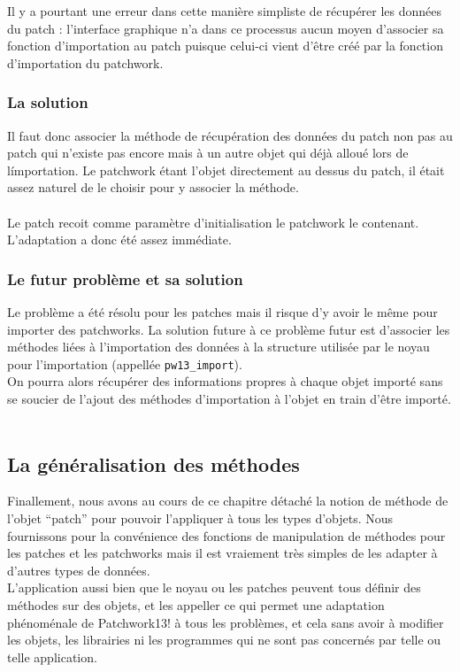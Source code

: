 Il y a pourtant une erreur dans cette mani\`ere simpliste
de r\'ecup\'erer les donn\'ees du patch : l'interface graphique n'a dans
ce processus aucun moyen d'associer sa fonction d'importation au patch
puisque celui-ci vient d'\^etre cr\'e\'e par la fonction d'importation
du patchwork.\\

\newpage

\subsubsection{La solution}

Il faut donc associer la m\'ethode de r\'ecup\'eration des donn\'ees
du patch non pas au patch qui n'existe pas encore mais \`a un autre
objet qui d\'ej\`a allou\'e lors de l\'importation. Le patchwork \'etant
l'objet directement au dessus du patch, il \'etait assez naturel de
le choisir pour y associer la m\'ethode.\\
\\
Le patch recoit comme param\`etre d'initialisation le patchwork
le contenant. L'adaptation a donc \'et\'e assez imm\'ediate.
\\

\subsubsection{Le futur probl\`eme et sa solution}

Le probl\`eme a \'et\'e r\'esolu pour les patches mais il risque d'y
avoir le m\^eme pour importer des patchworks.
La solution future \`a ce probl\`eme futur est d'associer les
m\'ethodes li\'ees \`a l'importation des donn\'ees \`a la structure
utilis\'ee par le noyau pour l'importation (appell\'ee {\tt pw13\_import}).\\
On pourra alors r\'ecup\'erer des informations propres \`a chaque objet
import\'e sans se soucier de l'ajout des m\'ethodes d'importation \`a
l'objet en train d'\^etre import\'e.\\
\\

\subsection{La g\'en\'eralisation des m\'ethodes}

Finallement, nous avons au cours de ce chapitre d\'etach\'e la
notion de m\'ethode de l'objet ``patch''
pour pouvoir l'appliquer \`a tous les types d'objets. Nous fournissons
pour la conv\'enience des fonctions de manipulation de m\'ethodes pour
les patches et les patchworks mais il est vraiement tr\`es simples
de les adapter \`a d'autres types de donn\'ees.\\

L'application aussi bien que le noyau ou les patches peuvent tous
d\'efinir des m\'ethodes sur des objets, et les appeller ce qui permet
une adaptation ph\'enom\'enale de Patchwork13! \`a tous les probl\`emes,
et cela sans avoir \`a modifier les objets, les librairies ni les
programmes qui ne sont pas concern\'es par telle ou telle application.
